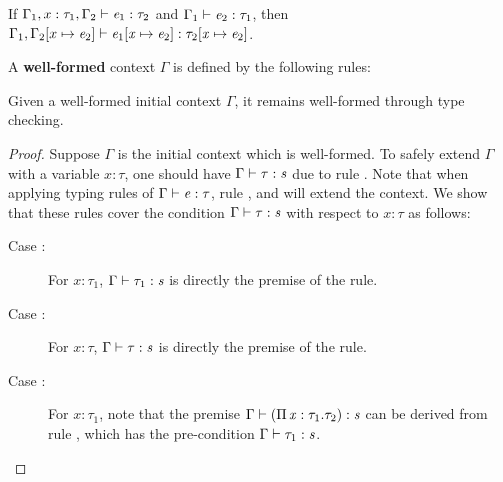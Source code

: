 \begin{lem}
	If $\Gamma_{{\mathrm{1}}}, x:\tau_{{\mathrm{1}}}, \Gamma_{{\mathrm{2}}}  \vdash  \mathit{e_{{\mathrm{1}}}}  :  \tau_{{\mathrm{2}}}$ and $\Gamma_{{\mathrm{1}}}  \vdash  \mathit{e_{{\mathrm{2}}}}  :  \tau_{{\mathrm{1}}}$, then $\Gamma_{{\mathrm{1}}}, \Gamma_{{\mathrm{2}}} [x  \mapsto  \mathit{e_{{\mathrm{2}}}} ]  \vdash  \mathit{e_{{\mathrm{1}}}}  [  \mathit{x}  \mapsto  \mathit{e_{{\mathrm{2}}}}  ] : \tau_{{\mathrm{2}}}  [  \mathit{x}  \mapsto  \mathit{e_{{\mathrm{2}}}}  ]$.
\end{lem}

\begin{dfn}
	A \textbf{well-formed} context $\Gamma$ is defined by the following rules:
	
	\textnormal{\ottdefnctx{}}
\end{dfn}

\begin{lem}\label{lem:wfc}
	Given a well-formed initial context $\Gamma$, it remains well-formed through type checking.
\end{lem}

\begin{proof}
	Suppose $\Gamma$ is the initial context which is well-formed. To safely extend $\Gamma$ with a variable $x:\tau$, one should have $\Gamma  \vdash  \tau  :  \mathit{s}$ due to rule . Note that when applying typing rules of $\Gamma  \vdash  \mathit{e}  :  \tau$, rule ,  and  will extend the context. We show that these rules cover the condition $\Gamma  \vdash  \tau  :  \mathit{s}$ with respect to $x:\tau$ as follows:
	\begin{description}
		\item[Case :] \ottusedrule{\ottdruleTXXPi{}} For $x:\tau_{{\mathrm{1}}}$, $\Gamma  \vdash  \tau_{{\mathrm{1}}}  :  \mathit{s}$ is directly the premise of the rule.
		\item[Case :] \ottusedrule{\ottdruleTXXMu{}} For $x:\tau$, $\Gamma  \vdash  \tau  :  \mathit{s}$ is directly the premise of the rule.
		\item[Case :] \ottusedrule{\ottdruleTXXLam{}} For $x:\tau_{{\mathrm{1}}}$, note that the premise $\Gamma  \vdash  (  \Pi \, \mathit{x}  :  \tau_{{\mathrm{1}}}  .  \tau_{{\mathrm{2}}}  )  :  \mathit{s}$ can be derived from rule , which has the pre-condition $\Gamma  \vdash  \tau_{{\mathrm{1}}}  :  \mathit{s}$.
	\end{description}
\end{proof}

